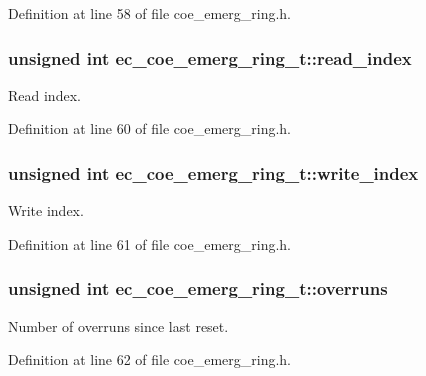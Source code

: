 Definition at line 58 of file coe\-\_\-emerg\-\_\-ring.\-h.

\subsubsection[{read\-\_\-index}]{\setlength{\rightskip}{0pt plus 5cm}unsigned int ec\-\_\-coe\-\_\-emerg\-\_\-ring\-\_\-t\-::read\-\_\-index}\label{structec__coe__emerg__ring__t_a80d30a36f0afa019ff6c30b0b9bb0cbe}


Read index. 



Definition at line 60 of file coe\-\_\-emerg\-\_\-ring.\-h.

\subsubsection[{write\-\_\-index}]{\setlength{\rightskip}{0pt plus 5cm}unsigned int ec\-\_\-coe\-\_\-emerg\-\_\-ring\-\_\-t\-::write\-\_\-index}\label{structec__coe__emerg__ring__t_ad4f4b63ee5489b89404912b1780fcf8a}


Write index. 



Definition at line 61 of file coe\-\_\-emerg\-\_\-ring.\-h.

\subsubsection[{overruns}]{\setlength{\rightskip}{0pt plus 5cm}unsigned int ec\-\_\-coe\-\_\-emerg\-\_\-ring\-\_\-t\-::overruns}\label{structec__coe__emerg__ring__t_a108ec818f8a5411a67fd78731b1e6c9b}


Number of overruns since last reset. 



Definition at line 62 of file coe\-\_\-emerg\-\_\-ring.\-h.

